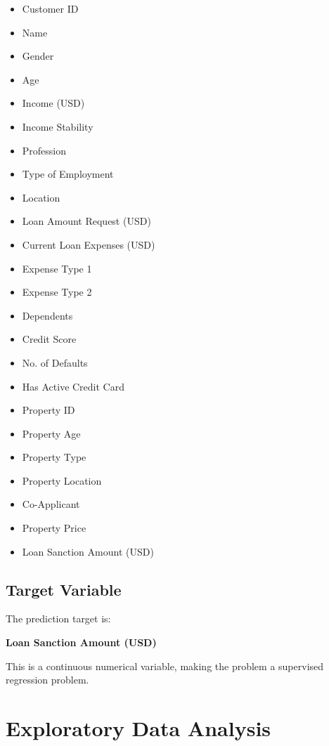 \documentclass[12pt,a4paper]{article}
\begin{document}
\begin{itemize}
    \item Customer ID
    \item Name
    \item Gender
    \item Age
    \item Income (USD)
    \item Income Stability
    \item Profession
    \item Type of Employment
    \item Location
    \item Loan Amount Request (USD)
    \item Current Loan Expenses (USD)
    \item Expense Type 1
    \item Expense Type 2
    \item Dependents
    \item Credit Score
    \item No. of Defaults
    \item Has Active Credit Card
    \item Property ID
    \item Property Age
    \item Property Type
    \item Property Location
    \item Co-Applicant
    \item Property Price
    \item Loan Sanction Amount (USD)
\end{itemize}

\subsection{Target Variable}

The prediction target is:

\begin{center}
\textbf{Loan Sanction Amount (USD)}
\end{center}

This is a continuous numerical variable, making the problem a supervised
regression problem.


\section{Exploratory Data Analysis}
\end{document}
